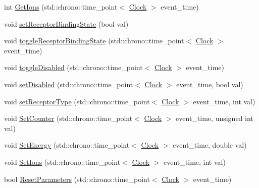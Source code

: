 \begin{DoxyCompactItemize}
\item 
int \hyperlink{class_membrane_channel_af20c4ca6a3708c86122e7118a29952fd}{Get\+Ions} (std\+::chrono\+::time\+\_\+point$<$ \hyperlink{universe_8h_a0ef8d951d1ca5ab3cfaf7ab4c7a6fd80}{Clock} $>$ event\+\_\+time)
\item 
void \hyperlink{class_membrane_channel_a9f5c69ab1f4dce6113fceebaaa4f15f4}{set\+Receptor\+Binding\+State} (bool val)
\item 
void \hyperlink{class_membrane_channel_a289ec477e64eec5d2a1f88f4a677650c}{toggle\+Receptor\+Binding\+State} (std\+::chrono\+::time\+\_\+point$<$ \hyperlink{universe_8h_a0ef8d951d1ca5ab3cfaf7ab4c7a6fd80}{Clock} $>$ event\+\_\+time)
\item 
void \hyperlink{class_membrane_channel_aabbadec31782704dd497848154dfe0fc}{toggle\+Disabled} (std\+::chrono\+::time\+\_\+point$<$ \hyperlink{universe_8h_a0ef8d951d1ca5ab3cfaf7ab4c7a6fd80}{Clock} $>$ event\+\_\+time)
\item 
void \hyperlink{class_membrane_channel_aed2055857888506a35c09bdcc265799a}{set\+Disabled} (std\+::chrono\+::time\+\_\+point$<$ \hyperlink{universe_8h_a0ef8d951d1ca5ab3cfaf7ab4c7a6fd80}{Clock} $>$ event\+\_\+time, bool val)
\item 
void \hyperlink{class_membrane_channel_a7f40594845bb0aa6a03fd9c08a836d7e}{set\+Receptor\+Type} (std\+::chrono\+::time\+\_\+point$<$ \hyperlink{universe_8h_a0ef8d951d1ca5ab3cfaf7ab4c7a6fd80}{Clock} $>$ event\+\_\+time, int val)
\item 
void \hyperlink{class_membrane_channel_a61931feff8f3bb485eeb5c80125bb732}{Set\+Counter} (std\+::chrono\+::time\+\_\+point$<$ \hyperlink{universe_8h_a0ef8d951d1ca5ab3cfaf7ab4c7a6fd80}{Clock} $>$ event\+\_\+time, unsigned int val)
\item 
void \hyperlink{class_membrane_channel_aaa2d816d3887b6292d995a83130a4834}{Set\+Energy} (std\+::chrono\+::time\+\_\+point$<$ \hyperlink{universe_8h_a0ef8d951d1ca5ab3cfaf7ab4c7a6fd80}{Clock} $>$ event\+\_\+time, double val)
\item 
void \hyperlink{class_membrane_channel_a1fe0c61eccbb6aa0d905ead27e8337bd}{Set\+Ions} (std\+::chrono\+::time\+\_\+point$<$ \hyperlink{universe_8h_a0ef8d951d1ca5ab3cfaf7ab4c7a6fd80}{Clock} $>$ event\+\_\+time, int val)
\item 
bool \hyperlink{class_membrane_channel_a5982040b46efe5e2b824d1cf4dead25e}{Reset\+Parameters} (std\+::chrono\+::time\+\_\+point$<$ \hyperlink{universe_8h_a0ef8d951d1ca5ab3cfaf7ab4c7a6fd80}{Clock} $>$ event\+\_\+time)
\item 

\end{DoxyCompactItemize}
